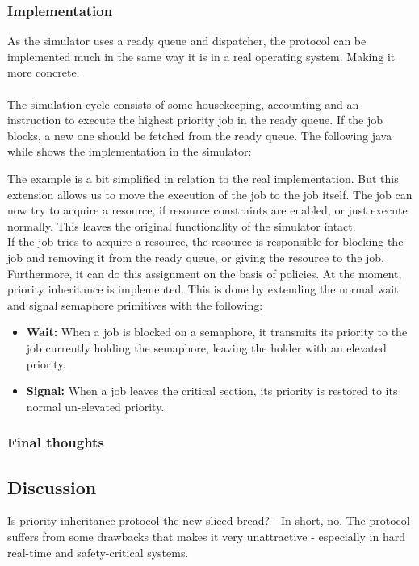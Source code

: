 \documentclass{acm_proc_article-sp}
\begin{document}
\subsubsection{Implementation}
As the simulator uses a ready queue and dispatcher, the protocol can be implemented much in the same way it is in a real operating system. Making it more concrete.\\\\
The simulation cycle consists of some housekeeping, accounting and an instruction to execute the highest priority job in the ready queue. If the job blocks, a new one should be fetched from the ready queue. The following java while shows the implementation in the simulator:

The example is a bit simplified in relation to the real implementation. But this extension allows us to move the execution of the job to the job itself. The job can now try to acquire a resource, if resource constraints are enabled, or just execute normally. This leaves the original functionality of the simulator intact.\\
If the job tries to acquire a resource, the resource is responsible for blocking the job and removing it from the ready queue, or giving the resource to the job.\\
Furthermore, it can do this assignment on the basis of policies. At the moment, priority inheritance is implemented. This is done by extending the normal wait and signal semaphore primitives with the following:
\begin{itemize}
\item \textbf{Wait:} When a job is blocked on a semaphore, it transmits its priority to the job currently holding the semaphore, leaving the holder with an elevated priority.
\item \textbf{Signal:} When a job leaves the critical section, its priority is restored to its normal un-elevated priority.
\end{itemize}

\subsubsection{Final thoughts}

\subsection{Discussion}
Is priority inheritance protocol the new sliced bread? - In short, no. The protocol suffers from some drawbacks that makes it very unattractive - especially in hard real-time and safety-critical systems.
\end{document}
